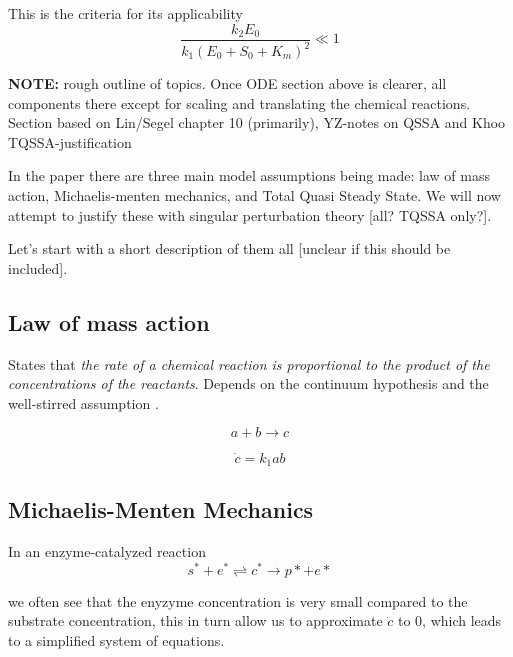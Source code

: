 \documentclass[12pt]{report}
\begin{document}
This is the criteria for its applicability
\begin{equation}
\frac{k_2 E_0}{k_1(E_0+S_0+K_m)^2} \ll 1
\end{equation}


\textbf{NOTE:} rough outline of topics. Once ODE section above is
clearer, all components there except for scaling and translating the
chemical reactions.  Section based on Lin/Segel chapter 10
(primarily), YZ-notes on QSSA and Khoo TQSSA-justification

In the paper there are three main model assumptions being made: law of
mass action, Michaelis-menten mechanics, and Total Quasi Steady
State. We will now attempt to justify these with singular perturbation
theory [all? TQSSA only?].

Let's start with a short description of them all [unclear if this should be included].

\subsection{Law of mass action}

States that \textit{the rate of a chemical reaction is proportional to the
product of the concentrations of the reactants}. Depends on the continuum
hypothesis and the well-stirred assumption \cite{Ingalls}.

\begin{equation}
a+b \rightarrow c
\end{equation}

\begin{equation}
\dot{c} = k_1 ab
\end{equation}

\subsection{Michaelis-Menten Mechanics}

In an enzyme-catalyzed reaction $$ s^* + e^* \rightleftharpoons
c^* \rightarrow p*+e* $$

we often see that the enyzyme concentration is very small compared to
the substrate concentration, this in turn allow us to approximate $\dot{c}$ to
0, which leads to a simplified system of equations.


\end{document}
